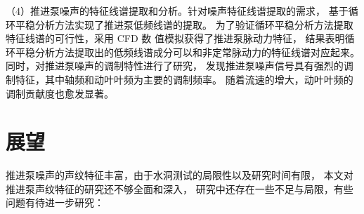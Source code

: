 （4）推进泵噪声的特征线谱提取和分析。针对噪声特征线谱提取的需求，
基于循环平稳分析方法实现了推进泵低频线谱的提取。
为了验证循环平稳分析方法提取特征线谱的可行性，采用 CFD 数
值模拟获得了推进泵脉动力特征，
结果表明循环平稳分析方法提取出的低频线谱成分可以和非定常脉动力的特征线谱对应起来。
同时，对推进泵噪声的调制特性进行了研究，
发现推进泵噪声信号具有强烈的调制特征，其中轴频和动叶叶频为主要的调制频率。
随着流速的增大，动叶叶频的调制贡献度也愈发显著。
\begin{comment}
\section{创新点}
本文基于循环平稳分析理论，建立了低信噪比条件下推进泵噪声特征线谱提取的研究方法。
在大型空泡水洞对单级推进泵和双级推进泵开展了噪声试验研究，获得了低信噪比条件下的推进泵噪声。
基于循环平稳分析方法实现了推进泵特征线谱的提取，提取到了轴频和叶频及其谐频等低频线谱成分。
采用CFD数值模拟获得了推进泵脉动力特征，结果表明循环平稳分析方法提取出的低频线谱成分可以和非定常脉动力的特征线谱相对应，
验证循环平稳分析方法提取特征线谱的可行性。

本文的主要创新点如下：

（1）基于 LabVIEW 设计了推进泵噪声测试与分析系统。
该系统支持同步对多通道传感器信号实时采集，各通道信号同时分析、显示及存储，具有操作简单、经济高
效等优势。基于系统的信号分析模块，可实现对推进泵噪声的频段能量分布特点、特征
频段总声压量级、频谱特征等声纹特征分析。


（1）在大型空泡水洞对单级推进泵和双级推进泵开展了噪声试验研究。
在考虑背景噪声影响的基础上，
研究不同工况下推进泵噪声的声纹特征变化，
以及流速等与噪声的声学关联性。
结果表明，中低频段噪声对推进泵噪声有显著贡献。
噪声中低频段、高频段和全频段的总声压级随着流速的增大而增大，
流速变化对推进泵噪声高频段的能量分布和总声压级影响较小，
对中低频段的能量分布和总声压级影响更加明显。

（2）基于循环平稳分析方法实现了推进泵特征线谱的提取，同时对推进泵噪声的调制特性进行了研究。
为了验证循环平稳分析方法提取特征线谱的可行性，
采用CFD数值模拟获得了推进泵脉动力特征，
结果表明循环平稳分析方法提取出的低频线谱成分可以和非定常脉动力的特征线谱对应起来。
推进泵噪声信号具有强烈的调制特征，其中轴频和动叶叶频的为主要的调制频率。
随着流速的增大，动叶叶频的调制贡献度也愈发显著。
\end{comment}
\section{展望}
推进泵噪声的声纹特征丰富，由于水洞测试的局限性以及研究时间有限，
本文对推进泵声纹特征的研究还不够全面和深入，
研究中还存在一些不足与局限，有些问题有待进一步研究：
\begin{comment}
（1）对推进泵低频线谱噪声的试验研究。
由于水洞测试的局限性，会影响推进泵低频噪声幅值量级的可靠性。
因此本文无法探讨线谱噪声的幅值量级等声纹特征，
只是关注不同工况下中低频段总声压级的相对幅值。
希望在后续的研究中，能精确测量推进泵的低频离散线谱值，
更为全面而深入的分析推进泵的声纹特征。
\end{comment}

